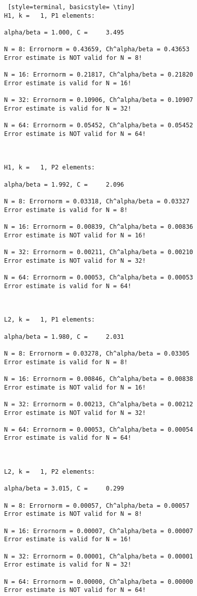 \documentclass[a4paper,english,12pt,twoside]{article}
\begin{document}
\begin{lstlisting} [style=terminal, basicstyle= \tiny]
H1, k =   1, P1 elements:

alpha/beta = 1.000, C =     3.495

N = 8: Errornorm = 0.43659, Ch^alpha/beta = 0.43653
Error estimate is NOT valid for N = 8!

N = 16: Errornorm = 0.21817, Ch^alpha/beta = 0.21820
Error estimate is valid for N = 16!

N = 32: Errornorm = 0.10906, Ch^alpha/beta = 0.10907
Error estimate is valid for N = 32!

N = 64: Errornorm = 0.05452, Ch^alpha/beta = 0.05452
Error estimate is NOT valid for N = 64!



H1, k =   1, P2 elements:

alpha/beta = 1.992, C =     2.096

N = 8: Errornorm = 0.03318, Ch^alpha/beta = 0.03327
Error estimate is valid for N = 8!

N = 16: Errornorm = 0.00839, Ch^alpha/beta = 0.00836
Error estimate is NOT valid for N = 16!

N = 32: Errornorm = 0.00211, Ch^alpha/beta = 0.00210
Error estimate is NOT valid for N = 32!

N = 64: Errornorm = 0.00053, Ch^alpha/beta = 0.00053
Error estimate is valid for N = 64!



L2, k =   1, P1 elements:

alpha/beta = 1.980, C =     2.031

N = 8: Errornorm = 0.03278, Ch^alpha/beta = 0.03305
Error estimate is valid for N = 8!

N = 16: Errornorm = 0.00846, Ch^alpha/beta = 0.00838
Error estimate is NOT valid for N = 16!

N = 32: Errornorm = 0.00213, Ch^alpha/beta = 0.00212
Error estimate is NOT valid for N = 32!

N = 64: Errornorm = 0.00053, Ch^alpha/beta = 0.00054
Error estimate is valid for N = 64!



L2, k =   1, P2 elements:

alpha/beta = 3.015, C =     0.299

N = 8: Errornorm = 0.00057, Ch^alpha/beta = 0.00057
Error estimate is NOT valid for N = 8!

N = 16: Errornorm = 0.00007, Ch^alpha/beta = 0.00007
Error estimate is valid for N = 16!

N = 32: Errornorm = 0.00001, Ch^alpha/beta = 0.00001
Error estimate is valid for N = 32!

N = 64: Errornorm = 0.00000, Ch^alpha/beta = 0.00000
Error estimate is NOT valid for N = 64!

\end{lstlisting}
\end{document}
